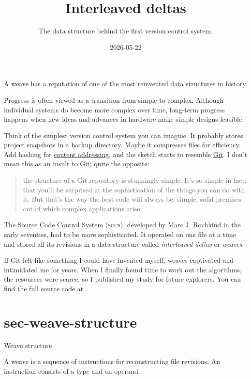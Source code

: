 \documentclass{article}
\title{Interleaved deltas}
\subtitle{The data structure behind the first version control system.}
\date{2026-05-22}
\begin{document}
\epigraph{
  A weave has a reputation of one of the most reinvented data structures in history.
}{}

Progress is often viewed as a transition from simple to complex.
Although individual systems do become more complex over time,
long-term progress happens when new ideas and advances in hardware
make simple designs feasible.

Think of the simplest version control system you can imagine.
It probably stores project snapshots in a backup directory.
Maybe it compresses files for efficiency.
Add hashing for \href{https://en.wikipedia.org/wiki/Content-addressable_storage}{content addressing},
and the sketch starts to resemble \href{https://git-scm.com/}{Git}.
I don't mean this as an insult to Git; quite the opposite:

\blockquote{
  the structure of a Git repository is stunningly simple.
  It's so simple in fact,
  that you'll be surprised at the sophistication of the things you can do with it.
  But that's the way the best code will always be:
  simple, solid premises out of which complex applications arise.
}{}

The \href{https://mrochkind.com/aup/talks/SCCS-Slideshow.pdf}{Source Code Control System}
(\textsc{sccs}), developed by Marc J. Rochkind in the early seventies,
had to be more sophisticated.
It operated on one file at a time
and stored all its revisions in a data structure
called \emph{interleaved deltas} or \emph{weaves}.

If Git felt like something I could have invented myself,
weaves captivated and intimidated me for years.
When I finally found time to work out the algorithms,
the resources were scarce,
so I published my study for future explorers.
You can find the full source code at \href{https://github.com/roman-kashitsyn/weaver}{}.

\section{sec-weave-structure}{Weave structure}

A weave is a sequence of instructions for reconstructing file revisions.
An instruction consists of a type and an operand.
\end{document}
